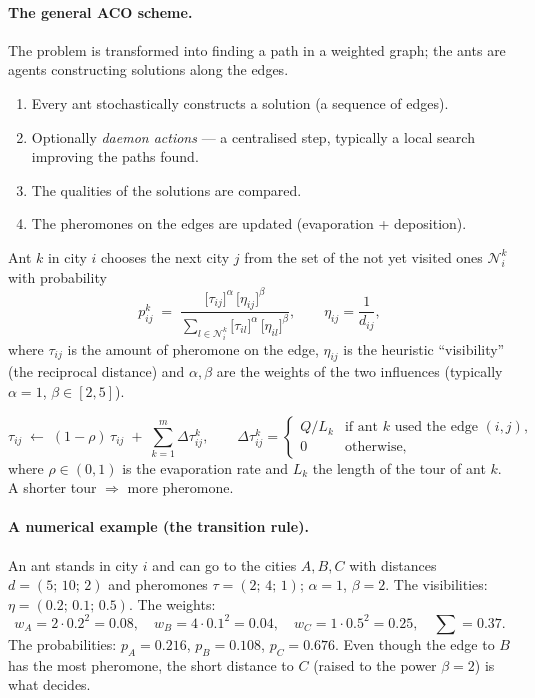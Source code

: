 \documentclass[11pt,a4paper]{article}
\theoremstyle{definition}
\providecommand{\uv}[1]{``#1''}
\begin{document}
\paragraph{The general ACO scheme.} The problem is transformed into finding a
path in a weighted graph; the ants are agents constructing solutions along the
edges.
\begin{enumerate}
\item Every ant stochastically constructs a solution (a sequence of edges).
\item Optionally \emph{daemon actions} --- a centralised step, typically a local
  search improving the paths found.
\item The qualities of the solutions are compared.
\item The pheromones on the edges are updated (evaporation + deposition).
\end{enumerate}

\begin{defbox}
Ant $k$ in city $i$ chooses the next city $j$ from the set of the not yet
visited ones $\mathcal{N}_i^k$ with probability
\[
p_{ij}^{k} \;=\;
\frac{\big[\tau_{ij}\big]^{\alpha}\,\big[\eta_{ij}\big]^{\beta}}
     {\sum_{l \in \mathcal{N}_i^k}\big[\tau_{il}\big]^{\alpha}\,\big[\eta_{il}\big]^{\beta}},
\qquad \eta_{ij} = \frac{1}{d_{ij}},
\]
where $\tau_{ij}$ is the amount of pheromone on the edge, $\eta_{ij}$ is the
heuristic \uv{visibility} (the reciprocal distance) and $\alpha, \beta$ are the
weights of the two influences (typically $\alpha = 1$, $\beta \in [2,5]$).
\end{defbox}

\begin{defbox}
\[
\tau_{ij} \;\gets\; (1-\rho)\,\tau_{ij} \;+\; \sum_{k=1}^{m} \Delta\tau_{ij}^{k},
\qquad
\Delta\tau_{ij}^{k} =
\begin{cases}
Q/L_k & \text{if ant } k \text{ used the edge } (i,j),\\
0 & \text{otherwise,}
\end{cases}
\]
where $\rho \in (0,1)$ is the evaporation rate and $L_k$ the length of the tour
of ant $k$. A shorter tour $\Rightarrow$ more pheromone.
\end{defbox}

\paragraph{A numerical example (the transition rule).} An ant stands in city $i$
and can go to the cities $A, B, C$ with distances $d = (5;\,10;\,2)$ and
pheromones $\tau = (2;\,4;\,1)$; $\alpha = 1$, $\beta = 2$.
The visibilities: $\eta = (0.2;\,0.1;\,0.5)$. The weights:
\[
w_A = 2 \cdot 0.2^2 = 0.08,\quad
w_B = 4 \cdot 0.1^2 = 0.04,\quad
w_C = 1 \cdot 0.5^2 = 0.25,\quad \textstyle\sum = 0.37 .
\]
The probabilities: $p_A = 0.216$, $p_B = 0.108$, $p_C = 0.676$.
Even though the edge to $B$ has the most pheromone, the short distance to $C$
(raised to the power $\beta = 2$) is what decides.
\end{document}

